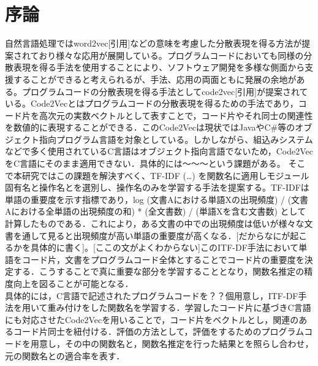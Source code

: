 \documentclass[submit]{ipsj}
\begin{document}
\section{序論}
自然言語処理ではword2vec[引用]などの意味を考慮した分散表現を得る方法が提案されており様々な応用が展開している。プログラムコードにおいても同様の分散表現を得る手法を使用することにより、ソフトウェア開発を多様な側面から支援することができると考えられるが、手法、応用の両面ともに発展の余地がある。プログラムコードの分散表現を得る手法としてcode2vec[引用]が提案されている。Code2Vecとはプログラムコードの分散表現を得るための手法であり，コード片を高次元の実数ベクトルとして表すことで，コード片やそれ同士の関連性を数値的に表現することができる．このCode2Vecは現状ではJavaやC#等のオブジェクト指向プログラム言語を対象としている。しかしながら、組込みシステムなどで多く使用されているC言語はオブジェクト指向言語でないため，Code2VecをC言語にそのまま適用できない．具体的には～～～という課題がある。
そこで本研究ではこの課題を解決すべく、TF-IDF (…) を関数名に適用しモジュール固有名と操作名とを選別し、操作名のみを学習する手法を提案する。TF-IDFは単語の重要度を示す指標であり，{log (文書Aにおける単語Xの出現頻度) / (文書Aにおける全単語の出現頻度の和)} * {(全文書数) / (単語Xを含む文書数)} として計算したものである．これにより，ある文書の中での出現頻度は低いが様々な文書を通して見ると出現頻度が高い単語の重要度が高くなる．[だからなにが起こるかを具体的に書く]。[ここの文がよくわからない]このITF-DF手法において単語をコード片，文書をプログラムコード全体とすることでコード片の重要度を決定する．こうすることで真に重要な部分を学習することとなり，関数名推定の精度向上を図ることが可能となる．\\
具体的には，C言語で記述されたプログラムコードを？？個用意し，ITF-DF手法を用いて重み付けをした関数名を学習する．学習したコード片に基づきC言語にも対応させたCode2Vecを用いることで，コード片をベクトルとし，関連のあるコード片同士を紐付ける．評価の方法として，評価をするためのプログラムコードを用意し，その中の関数名と，関数名推定を行った結果とを照らし合わせ，元の関数名との適合率を表す．
\end{document}
